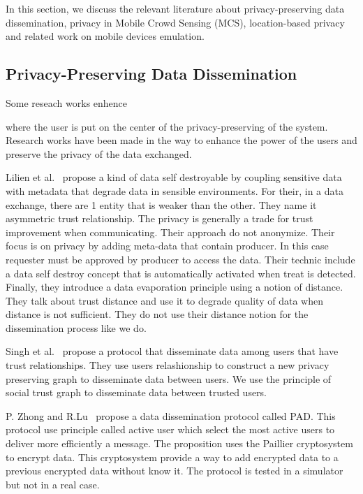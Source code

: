 

In this section, we discuss the relevant literature about privacy-preserving data dissemination, privacy in Mobile Crowd Sensing (MCS), location-based privacy and related work on mobile devices emulation.

\subsection{Privacy-Preserving Data Dissemination}



Some reseach works enhence 

where the user is put on the center of the privacy-preserving of the system.
Research works have been made in the way to enhance the power of the users and preserve the privacy of the data exchanged. 



Lilien et al.~\cite{DBLP:journals/tsmc/LilienB06} propose a kind of data self destroyable by coupling sensitive data with metadata that degrade data in sensible environments.
For their, in a data exchange, there are 1 entity that is weaker than the other. 
They name it asymmetric trust relationship.
The privacy is generally a trade for trust improvement when communicating.
Their approach do not anonymize.
Their focus is on privacy by adding meta-data that contain producer.
In this case requester must be approved by producer to access the data.
Their technic include a data self destroy concept that is automatically activated when treat is detected.
Finally, they introduce a data evaporation principle using a notion of distance.
They talk about trust distance and use it to degrade quality of data when distance is not sufficient.
They do not use their distance notion for the dissemination process like we do.

Singh et al.~\cite{DBLP:conf/icdcs/SinghUSV12} propose a protocol that disseminate data among users that have trust relationships.
They use users relashionship to construct a new privacy preserving graph to disseminate data between users. 
We use the principle of social trust graph to disseminate data between trusted users.

P. Zhong and R.Lu~\cite{DBLP:conf/iccoms/ZhongL14} propose a data dissemination protocol called PAD.
This protocol use principle called active user which select the most active users to deliver more efficiently a message.
The proposition uses the Paillier cryptosystem to encrypt data.
This cryptosystem provide a way to add encrypted data to a previous encrypted data without know it. 
The protocol is tested in a simulator but not in a real case.


